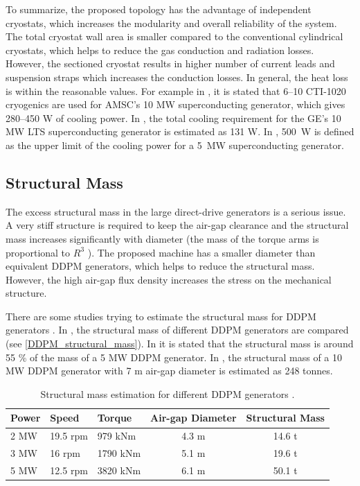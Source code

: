 \documentclass[final,peerreview,onecolumn]{IEEEtran}
\begin{document}
To summarize, the proposed topology has the advantage of independent cryostats, which increases the modularity and overall reliability of the system. The total cryostat wall area is smaller compared to the conventional cylindrical cryostats, which helps to reduce the gas conduction and radiation losses. However, the sectioned cryostat results in higher number of current leads and suspension straps which increases the conduction losses. In general, the heat loss is within the reasonable values. For example in \cite{Snitchler2011}, it is stated that 6--10 CTI-1020 cryogenics are used for AMSC's 10 MW superconducting generator, which gives 280--450 W of cooling power.
In \cite{Stautner2012}, the total cooling requirement for the GE's 10 MW LTS superconducting generator is estimated as 131 W. In \cite{Abrahamsen2012}, 500~W is defined as the upper limit of the cooling power for a 5~MW superconducting generator.


\subsection{Structural Mass}
The excess structural mass in the large direct-drive generators is a serious issue. A very stiff structure is required to keep the air-gap clearance and the structural mass increases significantly with diameter (the mass of the torque arms is proportional to $R^3$ \cite{McDonald2008b}). The proposed machine has a smaller diameter than equivalent DDPM generators, which helps to reduce the structural mass. However, the high air-gap flux density increases the stress on the mechanical structure.

There are some studies trying to estimate the structural mass for DDPM generators \cite{McDonald2008b, Zavvos2012}. In \cite{Bang2010}, the structural mass of different DDPM generators are compared (see \autoref{DDPM_structural_mass}). In \cite{Bang2010a} it is stated that the structural mass is around 55 \% of the mass of a 5 MW DDPM generator. In \cite{Zavvos2012}, the structural mass of a 10 MW DDPM generator with 7 m air-gap diameter is estimated as 248 tonnes. 

\begin{table}[t]
  \centering
  \begin{tabular}{lllcc}
 Power & Speed & Torque & Air-gap Diameter & Structural Mass\\ 
 \hline
2 MW & 19.5 rpm & 979 kNm & 4.3 m & 14.6 t \\
3 MW & 16 rpm & 1790 kNm & 5.1 m & 19.6 t \\
5 MW & 12.5 rpm & 3820 kNm & 6.1 m & 50.1 t \\
\hline
 \end{tabular}
  \caption{Structural mass estimation for different DDPM generators \cite{Bang2010}.}
  \label{DDPM_structural_mass}
\end{table}
\end{document}
